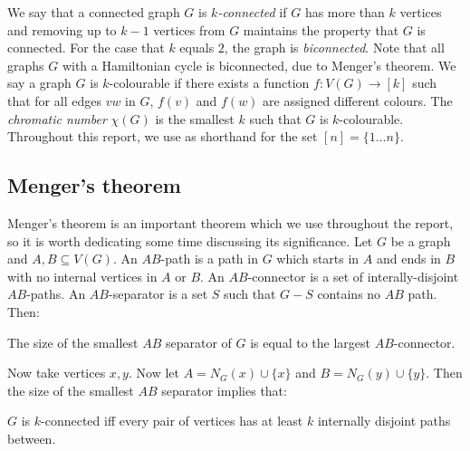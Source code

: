 We say that a connected graph \(G\) is \textit{\(k\)-connected} if \(G\) has more than \(k\) vertices and removing up to \(k-1\) vertices from \(G\) maintains the property that $G$ is connected. For the case that $k$ equals $2$, the graph is \textit{biconnected}. Note that all graphs \(G\) with a Hamiltonian cycle is biconnected, due to Menger's theorem.\cite{mengerZurAllgemeinenKurventheorie1927}
We say a graph \(G\) is \(k\)-colourable if there exists a function \(f: V(G) \rightarrow [k]\) such that for all edges $vw$ in $G$, \(f(v)\) and \(f(w)\) are assigned different colours. The \textit{chromatic number} \(\chi(G)\) is the smallest \(k\) such that \(G\) is \(k\)-colourable.
Throughout this report, we use as shorthand for the set \( [n] = \lbrace 1\ldots n \rbrace \).

\subsection{Menger's theorem}
Menger's theorem \cite{mengerZurAllgemeinenKurventheorie1927} is an important theorem which we use throughout the report, so it is worth dedicating some time discussing its significance.
Let \(G\) be a graph and \(A, B \subseteq V(G)\). An \(AB\)-path is a path in \(G\) which starts in \(A\) and ends in \(B\) with no internal vertices in \(A\) or \(B\). An \(AB\)-connector is a set of interally-disjoint \(AB\)-paths. An \(AB\)-separator is a set \(S\) such that \(G - S\) contains no \(AB\) path. Then:
\begin{theorem}\label{thm:Menger}
	The size of the smallest \(AB\) separator of \(G\) is equal to the largest \(AB\)-connector.
\end{theorem}
Now take vertices \(x, y\). Now let \(A = N_G(x) \cup \{x\} \) and \(B = N_G(y) \cup \{y\} \). Then the size of the smallest \(AB\) separator implies that:
\begin{theorem}\label{thm:Menger_Vertex}
	\(G\) is \(k\)-connected iff every pair of vertices has at least \(k\) internally disjoint paths between.
\end{theorem}

